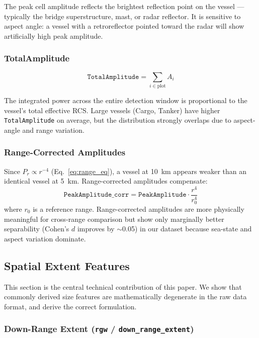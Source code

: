 \documentclass[journal]{IEEEtran}
\begin{document}
The peak cell amplitude reflects the brightest reflection point on the vessel —
typically the bridge superstructure, mast, or radar reflector. It is sensitive
to aspect angle: a vessel with a retroreflector pointed toward the radar
will show artificially high peak amplitude.

\subsubsection{TotalAmplitude}

\begin{equation}
  \texttt{TotalAmplitude} = \sum_{i \in \text{plot}} A_i
\end{equation}

The integrated power across the entire detection window is proportional to
the vessel's total effective RCS. Large vessels (Cargo, Tanker) have higher
\texttt{TotalAmplitude} on average, but the distribution strongly overlaps
due to aspect-angle and range variation.

\subsubsection{Range-Corrected Amplitudes}

Since $P_r \propto r^{-4}$ (Eq.~\ref{eq:range_eq}), a vessel at 10~km appears
weaker than an identical vessel at 5~km. Range-corrected amplitudes compensate:
\begin{equation}
  \texttt{PeakAmplitude\_corr} = \texttt{PeakAmplitude} \cdot \frac{r^4}{r_0^4}
\end{equation}
where $r_0$ is a reference range. Range-corrected amplitudes are more physically
meaningful for cross-range comparison but show only marginally better separability
(Cohen's $d$ improves by $\sim$0.05) in our dataset because sea-state and
aspect variation dominate.

\subsection{Spatial Extent Features}
\label{sec:size}

This section is the central technical contribution of this paper. We show that
commonly derived size features are mathematically degenerate in the raw data
format, and derive the correct formulation.

\subsubsection{Down-Range Extent (\texttt{rgw} / \texttt{down\_range\_extent})}
\end{document}
